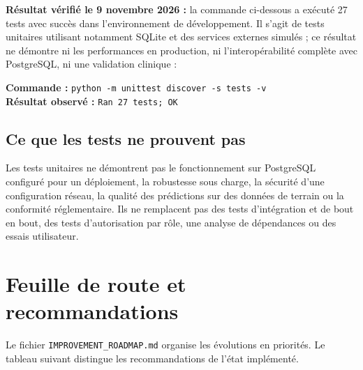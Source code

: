 \documentclass[11pt,a4paper]{report}
\newcommand{\code}[1]{\texttt{#1}}
\begin{document}
\textbf{Résultat vérifié le 9 novembre 2026 :} la commande ci-dessous a exécuté
27 tests avec succès dans l'environnement de développement. Il s'agit de tests
unitaires utilisant notamment SQLite et des services externes simulés ; ce
résultat ne démontre ni les performances en production, ni l'interopérabilité
complète avec PostgreSQL, ni une validation clinique :

\textbf{Commande :} \code{python -m unittest discover -s tests -v}\\
\textbf{Résultat observé :} \code{Ran 27 tests; OK}

\section{Ce que les tests ne prouvent pas}
Les tests unitaires ne démontrent pas le fonctionnement sur PostgreSQL
configuré pour un déploiement, la robustesse sous charge, la sécurité d'une
configuration réseau, la qualité des prédictions sur des données de terrain
ou la conformité réglementaire. Ils ne remplacent pas des tests d'intégration
et de bout en bout, des tests d'autorisation par rôle, une analyse de
dépendances ou des essais utilisateur.

\chapter{Feuille de route et recommandations}
Le fichier \code{IMPROVEMENT\_ROADMAP.md} organise les évolutions en priorités.
Le tableau suivant distingue les recommandations de l'état implémenté.
\end{document}
